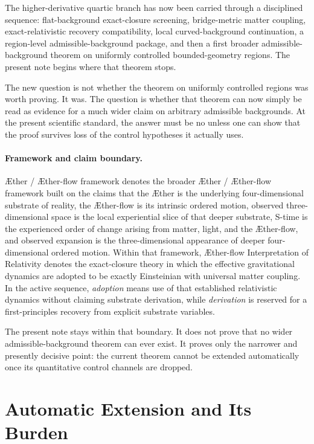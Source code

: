 \documentclass[11pt]{article}
\newcommand{\Aether}{\AE{}ther}
\newcommand{\Aflow}{\AE{}ther-flow}
\newcommand{\TheoryName}{\Aflow{} Interpretation of Relativity}
\newcommand{\TheoryProgram}{\Aether{} / \Aflow{} framework}
\begin{document}
The higher-derivative quartic branch has now been carried through a disciplined sequence: flat-background exact-closure screening, bridge-metric matter coupling, exact-relativistic recovery compatibility, local curved-background continuation, a region-level admissible-background package, and then a first broader admissible-background theorem on uniformly controlled bounded-geometry regions. The present note begins where that theorem stops.

The new question is not whether the theorem on uniformly controlled regions was worth proving. It was. The question is whether that theorem can now simply be read as evidence for a much wider claim on arbitrary admissible backgrounds. At the present scientific standard, the answer must be no unless one can show that the proof survives loss of the control hypotheses it actually uses.

\paragraph{Framework and claim boundary.}
\TheoryProgram{} denotes the broader \Aether{} / \Aflow{} framework built on the claims that the \Aether{} is the underlying four-dimensional substrate of reality, the \Aflow{} is its intrinsic ordered motion, observed three-dimensional space is the local experiential slice of that deeper substrate, S-time is the experienced order of change arising from matter, light, and the \Aflow{}, and observed expansion is the three-dimensional appearance of deeper four-dimensional ordered motion. Within that framework, \TheoryName{} denotes the exact-closure theory in which the effective gravitational dynamics are adopted to be exactly Einsteinian with universal matter coupling. In the active sequence, \emph{adoption} means use of that established relativistic dynamics without claiming substrate derivation, while \emph{derivation} is reserved for a first-principles recovery from explicit substrate variables.

The present note stays within that boundary. It does not prove that no wider admissible-background theorem can ever exist. It proves only the narrower and presently decisive point: the current theorem cannot be extended automatically once its quantitative control channels are dropped.

\section{Automatic Extension and Its Burden}
\end{document}
